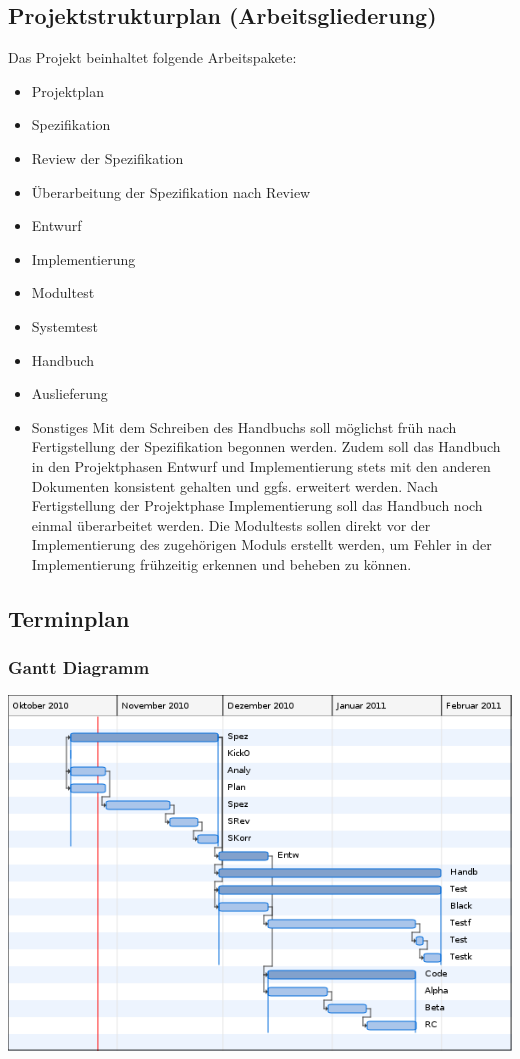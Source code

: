 \documentclass[a4paper,10pt]{scrartcl}
\begin{document}
\subsection{Projektstrukturplan (Arbeitsgliederung)}
Das Projekt beinhaltet folgende Arbeitspakete:
\begin{itemize}
\item Projektplan
\item Spezifikation
\item Review der Spezifikation
\item Überarbeitung der Spezifikation nach Review
\item Entwurf
\item Implementierung
\item Modultest
\item Systemtest
\item Handbuch
\item Auslieferung
\item Sonstiges
Mit
dem Schreiben des Handbuchs soll möglichst früh nach Fertigstellung der Spezifikation begonnen
werden. Zudem soll das Handbuch in den Projektphasen Entwurf und Implementierung stets mit
den anderen Dokumenten konsistent gehalten und ggfs. erweitert werden. Nach Fertigstellung der
Projektphase Implementierung soll das Handbuch noch einmal überarbeitet werden.
Die Modultests sollen direkt vor der Implementierung des zugehörigen Moduls erstellt werden, um
Fehler in der Implementierung frühzeitig erkennen und beheben zu können.
\end{itemize}
\subsection{Terminplan}
\subsubsection{Gantt Diagramm}
\includegraphics[width=15cm]{gantt.png}
\end{document}
